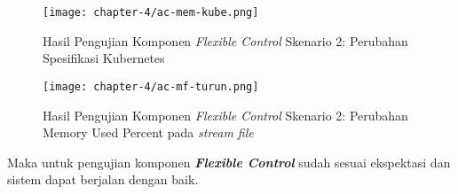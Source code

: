 \begin{figure}[h]
    \centering
    \texttt{[image: chapter-4/ac-mem-kube.png]}
    \caption{Hasil Pengujian Komponen \textit{Flexible Control} Skenario 2: Perubahan Spesifikasi Kubernetes}
    \label{fig:ac-mem-kube}
\end{figure}

\begin{figure}[h]
    \centering
    \texttt{[image: chapter-4/ac-mf-turun.png]}
    \caption{Hasil Pengujian Komponen \textit{Flexible Control} Skenario 2: Perubahan Memory Used Percent pada \textit{stream file}}
    \label{fig:ac-mf-turun}
\end{figure}

Maka untuk pengujian komponen \textbf{\textit{Flexible Control}} sudah sesuai ekspektasi dan sistem dapat berjalan dengan baik.